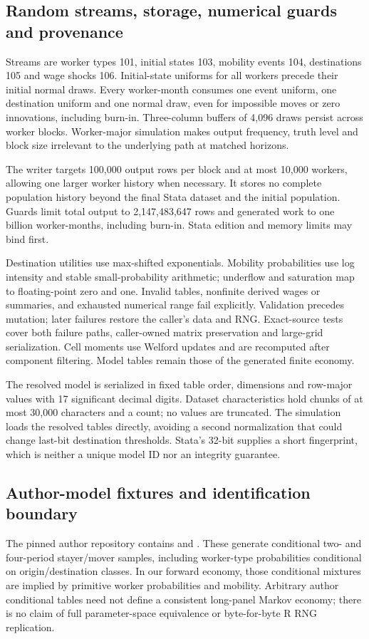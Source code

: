 \documentclass[11pt,letterpaper]{article}
\newcommand{\code}[1]{\texttt{\detokenize{#1}}}
\begin{document}
\subsection{Random streams, storage, numerical guards and provenance}
Streams are worker types 101, initial states 103, mobility events 104,
destinations 105 and wage shocks 106. Initial-state uniforms for all workers
precede their initial normal draws. Every worker-month consumes one event
uniform, one destination uniform and one normal draw, even for impossible moves
or zero innovations, including burn-in. Three-column buffers of 4,096 draws
persist across worker blocks. Worker-major simulation makes output frequency,
truth level and block size irrelevant to the underlying path at matched horizons.

The writer targets 100,000 output rows per block and at most 10,000 workers,
allowing one larger worker history when necessary. It stores no complete
population history beyond the final Stata dataset and the initial population.
Guards limit total output to 2,147,483,647 rows and generated work to one billion
worker-months, including burn-in. Stata edition and memory limits may bind first.

Destination utilities use max-shifted exponentials. Mobility probabilities use
log intensity and stable small-probability arithmetic; underflow and saturation
map to floating-point zero and one. Invalid tables, nonfinite derived wages or
summaries, and exhausted numerical range fail explicitly. Validation precedes
mutation; later failures restore the caller's data and RNG. Exact-source tests
cover both failure paths, caller-owned matrix preservation and large-grid
serialization. Cell moments use Welford updates and are recomputed after
component filtering. Model tables remain those of the generated finite economy.

The resolved model is serialized in fixed table order, dimensions and row-major
values with 17 significant decimal digits. Dataset characteristics hold chunks
of at most 30,000 characters and a count; no values are truncated. The simulation
loads the resolved tables directly, avoiding a second normalization that could
change last-bit destination thresholds. Stata's 32-bit \code{hash1()} supplies a
short fingerprint, which is neither a unique model ID nor an integrity guarantee.

\subsection{Author-model fixtures and identification boundary}
The pinned author repository contains \code{R/m2-mixt.r} and \code{R/m4-mixt.R}.
These generate conditional two- and four-period stayer/mover samples, including
worker-type probabilities conditional on origin/destination classes. In our
forward economy, those conditional mixtures are implied by primitive worker
probabilities and mobility. Arbitrary author conditional tables need not define
a consistent long-panel Markov economy; there is no claim of full parameter-space
equivalence or byte-for-byte R RNG replication.
\end{document}
